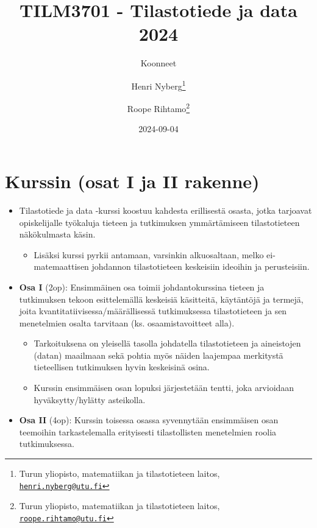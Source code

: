\documentclass[
]{book}
\title{TILM3701 - Tilastotiede ja data 2024}
\author{Koonneet \and Henri Nyberg\footnote{Turun yliopisto, matematiikan ja tilastotieteen laitos, \href{mailto:henri.nyberg@utu.fi}{\nolinkurl{henri.nyberg@utu.fi}}} \and Roope Rihtamo\footnote{Turun yliopisto, matematiikan ja tilastotieteen laitos, \href{mailto:roope.rihtamo@utu.fi}{\nolinkurl{roope.rihtamo@utu.fi}}}}
\date{2024-09-04}
\providecommand{\tightlist}{%
  \setlength{\itemsep}{0pt}\setlength{\parskip}{0pt}}
\begin{document}
\maketitle

{
\hypersetup{linkcolor=}
\setcounter{tocdepth}{1}
\tableofcontents
}
\hypertarget{kurssin-osat-i-ja-ii-rakenne}{%
\chapter*{Kurssin (osat I ja II rakenne)}\label{kurssin-osat-i-ja-ii-rakenne}}

\begin{itemize}
\tightlist
\item
  Tilastotiede ja data -kurssi koostuu kahdesta erillisestä osasta, jotka tarjoavat opiskelijalle työkaluja tieteen ja tutkimuksen ymmärtämiseen tilastotieteen näkökulmasta käsin.

  \begin{itemize}
  \tightlist
  \item
    Lisäksi kurssi pyrkii antamaan, varsinkin alkuosaltaan, melko ei-matemaattisen johdannon tilastotieteen keskeisiin ideoihin ja perusteisiin.
  \end{itemize}
\item
  \textbf{Osa I} (2op): Ensimmäinen osa toimii johdantokurssina tieteen ja tutkimuksen tekoon esittelemällä keskeisiä käsitteitä, käytäntöjä ja termejä, joita kvantitatiivisessa/määrällisessä tutkimuksessa tilastotieteen ja sen menetelmien osalta tarvitaan (ks. osaamistavoitteet alla).

  \begin{itemize}
  \tightlist
  \item
    Tarkoituksena on yleisellä tasolla johdatella tilastotieteen ja aineistojen (datan) maailmaan sekä pohtia myös näiden laajempaa merkitystä tieteellisen tutkimuksen hyvin keskeisinä osina.
  \item
    Kurssin ensimmäisen osan lopuksi järjestetään tentti, joka arvioidaan hyväksytty/hylätty asteikolla.
  \end{itemize}
\item
  \textbf{Osa II} (4op): Kurssin toisessa osassa syvennytään ensimmäisen osan teemoihin tarkastelemalla erityisesti tilastollisten menetelmien roolia tutkimuksessa.


\end{itemize}
\end{document}
